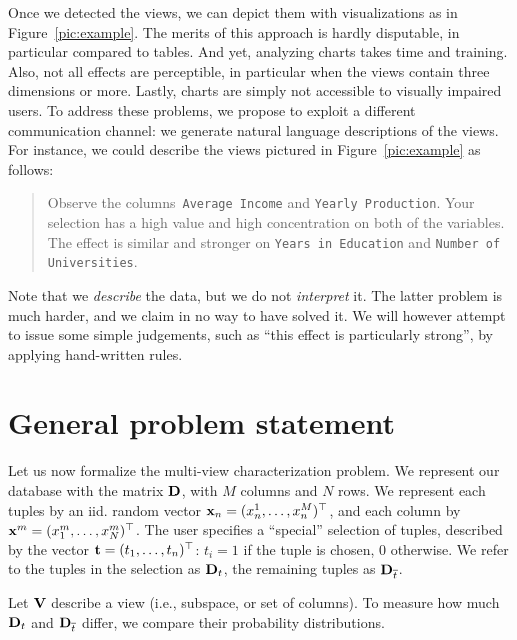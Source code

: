 Once we detected the views, we can depict them with visualizations as in
Figure~\ref{pic:example}. The merits of this approach is hardly disputable, in
particular compared to tables. And yet, analyzing charts takes time and
training. Also, not all effects are perceptible, in particular when the views
contain three dimensions or more. Lastly, charts are simply not accessible to
visually impaired users. To address these problems, we propose to exploit a
different communication channel: we generate natural language descriptions of
the views. For instance, we could describe the views pictured in
Figure~\ref{pic:example} as follows:
\begin{quotation}
    Observe the columns~\texttt{Average Income} and \texttt{Year\-ly Production}.
    Your selection has a high value and high concentration on both of the
    variables. The effect is similar and stronger on \texttt{Years in
    Education} and \texttt{Number of Universities}.
\end{quotation}
Note that we \emph{describe} the data, but we do not \emph{interpret} it. The
latter problem is much harder, and we claim in no way to have solved it. We
will however attempt to issue some simple judgements, such as ``this effect is
particularly strong'', by applying hand-written rules.


\section{General problem statement}
\label{sec:problem}
Let us now formalize the multi-view characterization problem. We represent our
database with the matrix $\mathbf{D}$, with $M$ columns and $N$ rows.  We represent
each tuples by an iid. random vector  $\mathbf{x}_n = (x^1_n, \dots, x^M_n)^\top$,
and each column by  $\mathbf{x}^{m}= (x^m_1, \dots, x^m_N)^\top$. The user
specifies a ``special'' selection of tuples, described by the vector $\mathbf{t} =
(t_1, \ldots, t_n)^\top$: $t_i=1$ if the tuple is chosen, 0 otherwise. We refer
to the tuples in the selection as ${\mathbf{D}}_t$, the remaining tuples as
${\mathbf{D}}_{\overline{t}}$. 

Let $\mathbf{V}$ describe a view (i.e., subspace, or set of columns). To measure
how much ${\mathbf{D}}_t$ and ${\mathbf{D}}_{\overline{t}}$ differ, we compare their
probability distributions. 


